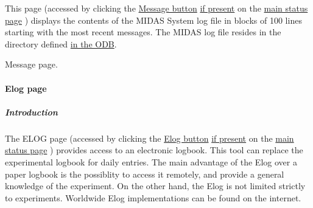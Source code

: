 \par


This page (accessed by clicking the \hyperlink{RC_mhttpd_status_page_features_RC_mhttpd_status_Page_buttons}{Message button} \hyperlink{RC_mhttpd_status_page_features_RC_mhttpd_status_menu_buttons}{if present} on the \hyperlink{RC_mhttpd_Main_Status_page_RC_mhttpd_main_status}{main status page} ) displays the contents of the MIDAS System log file in blocks of 100 lines starting with the most recent messages. The MIDAS log file resides in the directory defined \hyperlink{F_Messaging_F_Log_File}{in the ODB}.

\par
\par
\par
 \begin{center}  Message page. \par
\par
\par
  \end{center}  \par
\par
\par


\par




\par
 \label{index_end}
\hypertarget{index_end}{}
 \paragraph{Elog page}\label{RC_mhttpd_Elog_page}
\label{RC_mhttpd_Elog_page_idx_mhttpd_page_elog}
\hypertarget{RC_mhttpd_Elog_page_idx_mhttpd_page_elog}{}
 \par




\par


\label{RC_mhttpd_Elog_page_Elog_200}
\hypertarget{RC_mhttpd_Elog_page_Elog_200}{}
\hypertarget{RC_mhttpd_Elog_page_RC_mhttpd_Elog_intro}{}\subparagraph{Introduction}\label{RC_mhttpd_Elog_page_RC_mhttpd_Elog_intro}
The ELOG page (accessed by clicking the \hyperlink{RC_mhttpd_status_page_features_RC_mhttpd_status_Page_buttons}{Elog button} \hyperlink{RC_mhttpd_status_page_features_RC_mhttpd_status_menu_buttons}{if present} on the \hyperlink{RC_mhttpd_Main_Status_page_RC_mhttpd_main_status}{main status page} ) provides access to an electronic logbook. This tool can replace the experimental logbook for daily entries. The main advantage of the Elog over a paper logbook is the possiblity to access it remotely, and provide a general knowledge of the experiment. On the other hand, the Elog is not limited strictly to experiments. Worldwide Elog implementations can be found on the internet.


